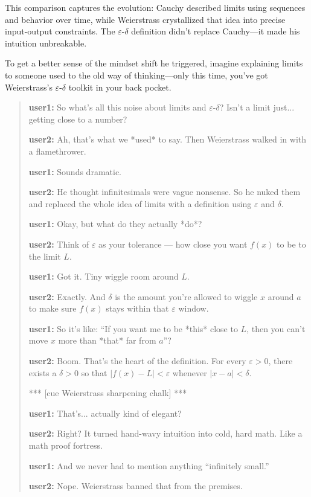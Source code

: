 \bigskip

This comparison captures the evolution: Cauchy described limits using sequences and behavior over time, while Weierstrass crystallized that idea into precise input-output constraints. The \(\varepsilon\)-\(\delta\) definition didn’t replace Cauchy—it made his intuition unbreakable.




To get a better sense of the mindset shift he triggered, imagine explaining limits to someone used to the old way of thinking—only this time, you’ve got Weierstrass’s \(\varepsilon\)-\(\delta\) toolkit in your back pocket.

\begin{quote}
{\ttfamily
\textbf{user1:} So what's all this noise about limits and $\varepsilon$-$\delta$? Isn’t a limit just... getting close to a number?

\textbf{user2:} Ah, that’s what we *used* to say. Then Weierstrass walked in with a flamethrower.

\textbf{user1:} Sounds dramatic.

\textbf{user2:} He thought infinitesimals were vague nonsense. So he nuked them and replaced the whole idea of limits with a definition using $\varepsilon$ and $\delta$.

\textbf{user1:} Okay, but what do they actually *do*?

\textbf{user2:} Think of $\varepsilon$ as your tolerance — how close you want $f(x)$ to be to the limit $L$.

\textbf{user1:} Got it. Tiny wiggle room around $L$.

\textbf{user2:} Exactly. And $\delta$ is the amount you're allowed to wiggle $x$ around $a$ to make sure $f(x)$ stays within that $\varepsilon$ window.

\textbf{user1:} So it's like: “If you want me to be *this* close to $L$, then you can’t move $x$ more than *that* far from $a$”?

\textbf{user2:} Boom. That’s the heart of the definition. For every $\varepsilon > 0$, there exists a $\delta > 0$ so that $|f(x) - L| < \varepsilon$ whenever $|x - a| < \delta$.

*** [cue Weierstrass sharpening chalk] ***

\textbf{user1:} That’s... actually kind of elegant?

\textbf{user2:} Right? It turned hand-wavy intuition into cold, hard math. Like a math proof fortress.

\textbf{user1:} And we never had to mention anything “infinitely small.”

\textbf{user2:} Nope. Weierstrass banned that from the premises. 
}
\end{quote}


